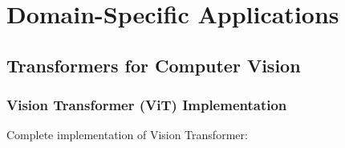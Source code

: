 \documentclass[11pt]{article}
\begin{document}
\section{Domain-Specific Applications}

\subsection{Transformers for Computer Vision}

\subsubsection{Vision Transformer (ViT) Implementation}

Complete implementation of Vision Transformer:
\end{document}
